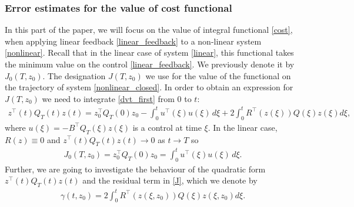 \documentclass[../main.tex]{subfiles}
\begin{document}
\subsubsection{Error estimates for the value of cost functional}

In this part  of the paper, we will focus on the value of integral functional \eqref{cost}, when applying linear feedback \eqref{linear_feedback} to a non-linear system \eqref{nonlinear}. Recall that in the linear case of system \eqref{linear}, this functional takes the minimum value on the control \eqref{linear_feedback}. We previously denote it by $J_0(T,z_0)$. The designation $J(T,z_0)$ we use for the value of the functional on the trajectory  of system \eqref{nonlinear_closed}.
 In order to obtain an  expression for $J(T,z_0)$ we need to integrate \eqref{dvt_first} from $0$ to $t$:
\begin{gather}\label{J}
	z^{\top}(t) Q_T(t)z(t) = z_0^{\top} Q_T(0)z_0 - \int_{0}^{t} u^{\top}(\xi)  u(\xi) \, d\xi + 2\int_{0}^{t}  R^{\top}(z(\xi))Q(\xi) z(\xi) d\xi,
\end{gather}
    where $ u(\xi) = -B^{\top} Q_T(\xi) z(\xi)$ is a control at time $\xi$. In the linear case, $R(z) \equiv 0$ and $z^{\top}(t) Q_T(t)z(t) \to 0 $ as $t \to T$ so
\begin{gather*}
    J_0(T,z_0) = z_0^{\top} Q_T(0)z_0 = \int_{0}^{t} u^{\top}(\xi)  u(\xi) \, d\xi.
\end{gather*}
Further, we are going to investigate the behaviour of the quadratic form $z^{\top}(t) Q_T(t)z(t) $ and the residual term in \eqref{J}, which we denote by
\begin{gather*}
			\gamma (t,z_0) = 
		 2\int_{0}^{t}  R^{\top}(z(\xi,z_0))Q(\xi) z(\xi,z_0) d\xi.
\end{gather*}
\end{document}
